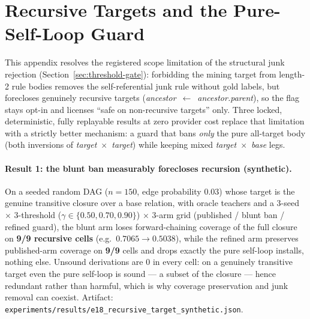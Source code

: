 \section{Recursive Targets and the Pure-Self-Loop Guard}
\label{sec:recursive-boundary}

This appendix resolves the registered scope limitation of the structural
junk rejection (Section~\ref{sec:threshold-gate}): forbidding the mining
target from length-2 rule bodies removes the self-referential junk rule
without gold labels, but forecloses genuinely recursive targets
(\emph{ancestor}~$\leftarrow$~\emph{ancestor.parent}), so the flag stays
opt-in and licenses ``safe on non-recursive targets'' only. Three locked,
deterministic, fully replayable results at zero provider cost replace that
limitation with a strictly better mechanism: a guard that bans \emph{only}
the pure all-target body (both inversions of
\emph{target}~$\times$~\emph{target}) while keeping mixed
\emph{target}~$\times$~\emph{base} legs.

\paragraph{Result 1: the blunt ban measurably forecloses recursion (synthetic).}
On a seeded random DAG ($n{=}150$, edge probability $0.03$) whose target is
the genuine transitive closure over a base relation, with oracle teachers
and a $3$-seed $\times$ $3$-threshold ($\gamma \in \{0.50, 0.70, 0.90\}$)
$\times$ $3$-arm grid (published / blunt ban / refined guard), the blunt
arm loses forward-chaining coverage of the full closure on \textbf{9/9
recursive cells} (e.g.\ $0.7065 \rightarrow 0.5038$), while the refined arm
preserves published-arm coverage on \textbf{9/9} cells and drops exactly
the pure self-loop installs, nothing else. Unsound derivations are $0$ in
every cell: on a genuinely transitive target even the pure self-loop is
sound --- a subset of the closure --- hence redundant rather than harmful,
which is why coverage preservation and junk removal can coexist. Artifact:
\texttt{experiments/results/e18\_recursive\_target\_synthetic.json}.

